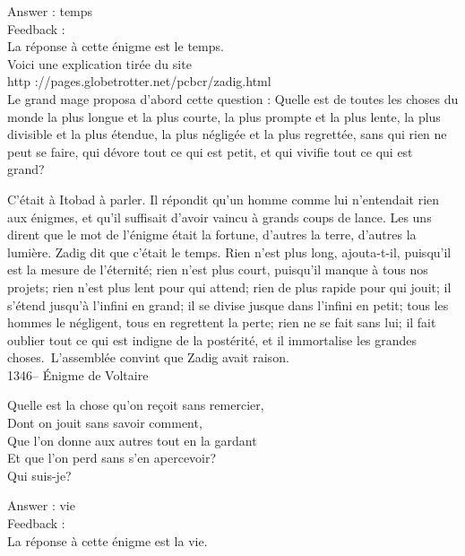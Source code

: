 ﻿\documentclass[letterpaper, 12pt]{article}
\begin{document}
Answer : temps\\

Feedback : \\
La r\'eponse \`a cette \'enigme est le temps.  \\
Voici une explication tir\'ee du site\\
http ://pages.globetrotter.net/pcbcr/zadig.html\\

Le grand mage proposa d'abord cette question : \og Quelle est de
toutes les choses du monde la plus longue et la plus courte, la plus
prompte et la plus lente, la plus divisible et la plus \'etendue, la
plus n\'eglig\'ee et la plus regrett\'ee, sans qui rien ne peut se
faire, qui d\'evore tout ce qui est petit, et qui vivifie tout ce
qui est grand?\fg\

C'\'etait \`a Itobad \`a parler. Il r\'epondit qu'un homme comme lui
n'entendait rien aux \'enigmes, et qu'il suffisait d'avoir vaincu
\`a grands coups de lance. Les uns dirent que le mot de l'\'enigme
\'etait la fortune, d'autres la terre, d'autres la lumi\`ere. Zadig
dit que c'\'etait le temps. \og Rien n'est plus long, ajouta-t-il,
puisqu'il est la mesure de l'\'eternit\'e; rien n'est plus court,
puisqu'il manque \`a tous nos projets; rien n'est plus lent pour qui
attend; rien de plus rapide pour qui jouit; il s'\'etend jusqu'\`a
l'infini en grand; il se divise jusque dans l'infini en petit; tous
les hommes le n\'egligent, tous en regrettent la perte; rien ne se
fait sans lui; il fait oublier tout ce qui est indigne de la
post\'erit\'e, et il immortalise les grandes choses.\fg\
L'assembl\'ee convint que Zadig avait raison.\\


1346-- \'Enigme de Voltaire\\
\begin{center}{Quelle est la chose qu'on re\c coit sans remercier, \\
Dont on jouit sans savoir comment,\\
Que l'on donne aux autres tout en la gardant\\
Et que l'on perd sans s'en apercevoir?\\
Qui suis-je?\\}
\end{center}

Answer : vie\\

Feedback : \\
La r\'eponse \`a cette \'enigme est la vie.\\
\end{document}
